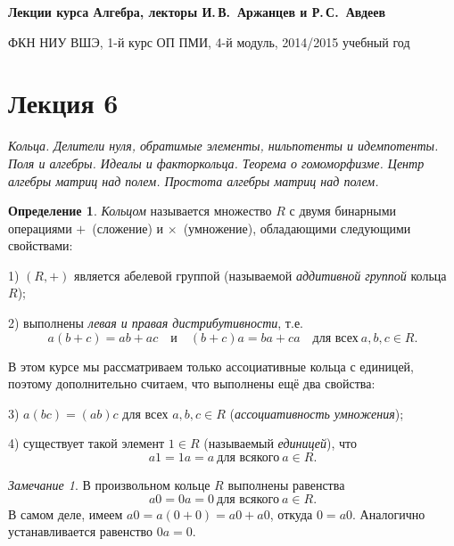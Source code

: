 \documentclass[a4paper,10pt]{amsart}
\theoremstyle{definition}
\newtheorem{definition}{Определение}
\theoremstyle{remark}
\newtheorem{remark}{Замечание}
\begin{document}
%
\sloppy
%
\centerline{\large \bf Лекции курса \guillemotleft
Алгебра\guillemotright{}, лекторы И.\,В.~Аржанцев и Р.\,С.~Авдеев}

\smallskip

\centerline{\large ФКН НИУ ВШЭ, 1-й курс ОП ПМИ, 4-й модуль,
2014/2015 учебный год}


\bigskip

\section*{Лекция 6}

\medskip

{\it Кольца. Делители нуля, обратимые элементы, нильпотенты и
идемпотенты. Поля и алгебры. Идеалы и факторкольца. Теорема о
гомоморфизме. Центр алгебры матриц над полем. Простота алгебры
матриц над полем.}

\medskip

\begin{definition}
{\it Кольцом} называется множество $R$ с двумя бинарными операциями
\guillemotleft $+$\guillemotright{}~(сложение) и \guillemotleft
$\times$\guillemotright{}~(умножение), обладающими следующими
свойствами:

1) $(R,+)$ является абелевой группой (называемой {\it аддитивной
группой} кольца $R$);

2) выполнены {\it левая и правая дистрибутивности}, т.е.
$$
a(b+c)=ab+ac \quad \text{и} \quad (b+c)a=ba+ca \quad \text{для всех}
\ a,b,c\in R.
$$

В этом курсе мы рассматриваем только ассоциативные кольца с
единицей, поэтому дополнительно считаем, что выполнены ещё два
свойства:

3) $a(bc)=(ab)c$ для всех $a,b,c\in R$ (\textit{ассоциативность
умножения});

4) существует такой элемент $1\in R$ (называемый \textit{единицей}),
что
\begin{equation} \label{eq1}
a1 = 1a = a \ \text{для всякого} \ a \in R.
\end{equation}
\end{definition}

\begin{remark}
В произвольном кольце $R$ выполнены равенства
\begin{equation} \label{eq2}
a0 = 0a = 0 \ \text{для всякого} \ a \in R.
\end{equation}
В самом деле, имеем $a0 = a(0 + 0) = a0 + a0$, откуда $0 = a0$.
Аналогично устанавливается равенство $0a = 0$.
\end{remark}
\end{document}
